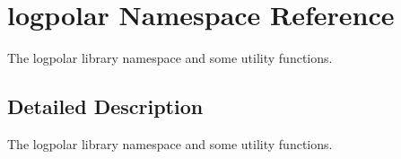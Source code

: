 \section{logpolar Namespace Reference}
\label{namespacelogpolar}


The logpolar library namespace and some utility functions.  




\subsection{Detailed Description}
The logpolar library namespace and some utility functions. 